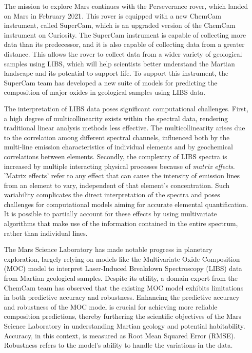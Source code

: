 The mission to explore Mars continues with the Perseverance rover, which landed on Mars in February 2021.
This rover is equipped with a new ChemCam instrument, called SuperCam, which is an upgraded version of the ChemCam instrument on Curiosity.
The SuperCam instrument is capable of collecting more data than its predecessor, and it is also capable of collecting data from a greater distance.
This allows the rover to collect data from a wider variety of geological samples using LIBS, which will help scientists better understand the Martian landscape and its potential to support life.\cite{mars-2020-perseverance}
To support this instrument, the SuperCam team has developed a new suite of models for predicting the composition of major oxides in geological samples using LIBS data\cite{andersonPostlandingMajorElement2022}.

The interpretation of LIBS data poses significant computational challenges.
First, a high degree of multicollinearity exists within the spectral data, rendering traditional linear analysis methods less effective.
The multicollinearity arises due to the correlation among different spectral channels, influenced both by the multi-line emission characteristics of individual elements and by geochemical correlations between elements.
Secondly, the complexity of LIBS spectra is increased by multiple interacting physical processes because of \textit{matrix effects}. 'Matrix effects' refer to any effect that can cause the intensity of emission lines from an element to vary, independent of that element's concentration. Such variability complicates the direct interpretation of the spectra and poses challenges for computational models aiming for accurate elemental quantification.
It is possible to partially account for these effects by using multivariate algorithms that make use of the information contained in the entire spectrum, rather than individual lines.\cite{andersonImprovedAccuracyQuantitative2017}

The Mars Science Laboratory has made notable progress in planetary exploration, largely relying on models like the Multivariate Oxide Composition (MOC) model to interpret Laser-Induced Breakdown Spectroscopy (LIBS) data from Martian geological samples.
Despite its utility, a domain expert from the ChemCam team has observed that the existing MOC model exhibits limitations in both predictive accuracy and robustness.
Enhancing the predictive accuracy and robustness of the MOC model is crucial for achieving more reliable composition predictions, thereby furthering the scientific objectives of the Mars Science Laboratory in understanding Martian geology and potential habitability.
Accuracy, in this context, is measured as Root Mean Squared Error (RMSE).
Robustness refers to the model's ability to handle the variations in the data.

